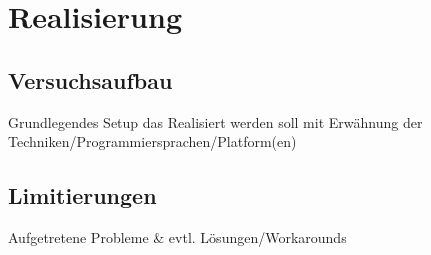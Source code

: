 \chapter{Realisierung}
\section{Versuchsaufbau}
Grundlegendes Setup das Realisiert werden soll mit Erwähnung der Techniken/Programmiersprachen/Platform(en)
\section{Limitierungen}
Aufgetretene Probleme \& evtl. Lösungen/Workarounds